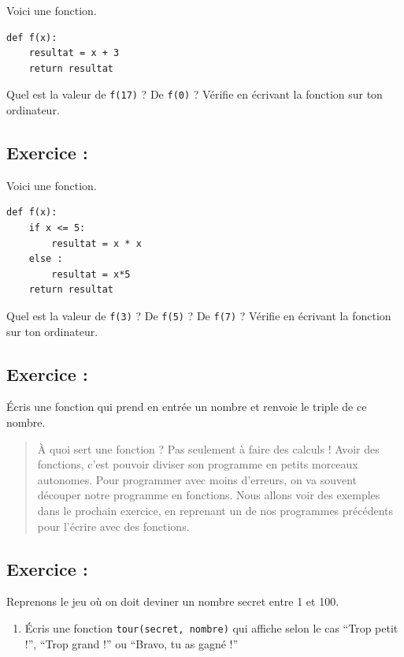 \documentclass[a4paper,french,11pt]{article}
\providecommand{\tightlist}{%
  \setlength{\itemsep}{0pt}\setlength{\parskip}{0pt}}
\begin{document}
Voici une fonction.

\begin{verbatim}
def f(x):
    resultat = x + 3
    return resultat
\end{verbatim}

Quel est la valeur de \texttt{f(17)} ? De
\texttt{f(0)} ? Vérifie en écrivant la fonction sur ton
ordinateur.

\hypertarget{exercice-21}{%
\subsection{Exercice :}\label{exercice-21}}

Voici une fonction.

\begin{verbatim}
def f(x):
    if x <= 5:
        resultat = x * x
    else :
        resultat = x*5
    return resultat
\end{verbatim}

Quel est la valeur de \texttt{f(3)} ? De
\texttt{f(5)} ? De \texttt{f(7)} ? Vérifie en
écrivant la fonction sur ton ordinateur.

\hypertarget{exercice-22}{%
\subsection{Exercice :}\label{exercice-22}}

Écris une fonction qui prend en entrée un nombre et renvoie le triple de
ce nombre.

\begin{quote}
À quoi sert une fonction ? Pas seulement à faire des calculs ! Avoir des
fonctions, c'est pouvoir diviser son programme en petits morceaux
autonomes. Pour programmer avec moins d'erreurs, on va souvent découper
notre programme en fonctions. Nous allons voir des exemples dans le
prochain exercice, en reprenant un de nos programmes précédents pour
l'écrire avec des fonctions.
\end{quote}

\hypertarget{exercice-23}{%
\subsection{Exercice :}\label{exercice-23}}

Reprenons le jeu où on doit deviner un nombre secret entre 1 et 100.

\begin{enumerate}
\def\labelenumi{\arabic{enumi}.}
\tightlist
\item
  Écris une fonction \texttt{tour(secret, nombre)} qui
  affiche selon le cas ``Trop petit !'', ``Trop grand !'' ou ``Bravo, tu
  as gagné !''
\end{enumerate}
\end{document}
